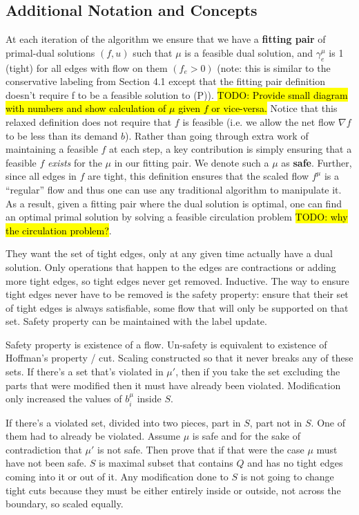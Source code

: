 \documentclass[11pt]{article}
\theoremstyle{definition}
\theoremstyle{definition}
\newcommand{\biu}{b_{i}^{\mu}}
\newcommand{\todo}[1]{\hl{TODO: #1}}
\begin{document}
    \subsection{Additional Notation and Concepts}
At each iteration of the algorithm we ensure that we have a \textbf{fitting pair} of primal-dual solutions $(f,u)$ such that $\mu$ is a feasible dual solution, and $\gamma_e^{\mu}$ is 1 (tight) for all edges with flow on them $(f_e > 0)$ (note: this is similar to the conservative labeling from Section 4.1 except that the fitting pair definition doesn't require f to be a feasible solution to (P)). \todo{Provide small diagram with numbers and show calculation of $\mu$ given $f$ or vice-versa.} Notice that this relaxed definition does not require that $f$ is feasible (i.e. we allow the net flow $\nabla f $ to be less than its demand $b$). Rather than going through extra work of maintaining a feasible $f$ at each step, a key contribution is simply ensuring that a feasible $f$ \textit{exists} for the $\mu$ in our fitting pair. We denote such a $\mu$ as \textbf{safe}. Further, since all edges in $f$ are tight, this definition ensures that the scaled flow $f^{\mu}$ is a ``regular'' flow and thus one can use any traditional algorithm to manipulate it. As a result, given a fitting pair where the dual solution is optimal, one can find an optimal primal solution by solving a feasible circulation problem \todo{why the circulation problem?}. 

They want the set of tight edges, only at any given time actually have a dual solution. Only operations that happen to the edges are contractions or adding more tight edges, so tight edges never get removed. Inductive. The way to ensure tight edges never have to be removed is the safety property: ensure that their set of tight edges is always satisfiable, some flow that will only be supported on that set. Safety property can be maintained with the label update. 

Safety property is existence of a flow. Un-safety is equivalent to existence of Hoffman's property / cut. Scaling constructed so that it never breaks any of these sets. If there's a set that's violated in $\mu'$, then if you take the set excluding the parts that were modified then it must have already been violated. Modification only increased the values of $\biu$ inside $S$.

If there's a violated set, divided into two pieces, part in $S$, part not in $S$. One of them had to already be violated. Assume $\mu$ is safe and for the sake of contradiction that $\mu'$ is not safe. Then prove that if that were the case $\mu$ must have not been safe. 
$S$ is maximal subset that contains $Q$ and has no tight edges coming into it or out of it. Any modification done to $S$ is not going to change tight cuts because they must be either entirely inside or outside, not across the boundary, so scaled equally. 
\end{document}
